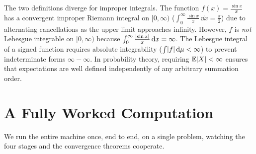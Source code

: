 \begin{trapbox}
The two definitions diverge for improper integrals. The function
$f(x)=\frac{\sin x}{x}$ has a convergent improper Riemann integral on
$[0,\infty)$ ($\int_0^\infty \frac{\sin x}{x}\,\dd x = \frac\pi2$) due to alternating
cancellations as the upper limit approaches infinity. However, $f$ is \emph{not}
Lebesgue integrable on $[0,\infty)$ because
$\int_0^\infty \frac{\lvert\sin x\rvert}{x}\,\mathrm{d} x = \infty$. The Lebesgue integral of a
signed function requires absolute integrability ($\int\lvert f\rvert\,\mathrm{d}\mu<\infty$) to prevent
indeterminate forms $\infty-\infty$. In probability theory, requiring $\operatorname{\mathbb{E}}\lvert X\rvert<\infty$
ensures that expectations are well defined independently of any arbitrary summation order.
\end{trapbox}

\section{A Fully Worked Computation}
\label{ch37:worked}

We run the entire machine once, end to end, on a single problem, watching the
four stages and the convergence theorems cooperate.

